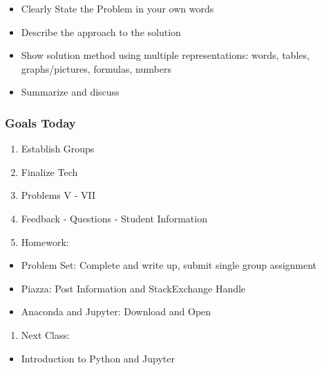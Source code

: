 \documentclass[11pt]{article}
\providecommand{\tightlist}{%
      \setlength{\itemsep}{0pt}\setlength{\parskip}{0pt}}
\begin{document}
\begin{itemize}
\tightlist
\item
  Clearly State the Problem in your own words
\item
  Describe the approach to the solution
\item
  Show solution method using multiple representations: words, tables,
  graphs/pictures, formulas, numbers
\item
  Summarize and discuss
\end{itemize}

\subsubsection{Goals Today}\label{goals-today}

\begin{enumerate}
\def\labelenumi{\arabic{enumi}.}
\tightlist
\item
  Establish Groups
\item
  Finalize Tech
\item
  Problems V - VII
\item
  Feedback - Questions - Student Information
\item
  Homework:
\end{enumerate}

\begin{itemize}
\tightlist
\item
  Problem Set: Complete and write up, submit single group assignment
\item
  Piazza: Post Information and StackExchange Handle
\item
  Anaconda and Jupyter: Download and Open
\end{itemize}

\begin{enumerate}
\def\labelenumi{\arabic{enumi}.}
\setcounter{enumi}{5}
\tightlist
\item
  Next Class:
\end{enumerate}

\begin{itemize}
\tightlist
\item
  Introduction to Python and Jupyter
\end{itemize}


    
    
    
    
\end{document}
